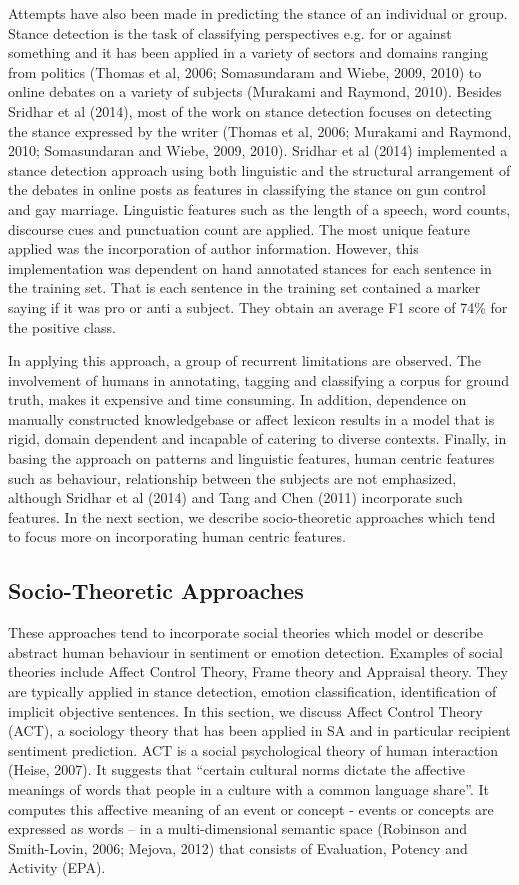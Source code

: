 Attempts have also been made in predicting the stance of an individual or group. Stance detection is the task of classifying perspectives e.g. for or against something and it has been applied in a variety of sectors and domains ranging from politics (Thomas et al, 2006; Somasundaram and Wiebe, 2009, 2010) to online debates on a variety of subjects (Murakami and Raymond, 2010). Besides Sridhar et al (2014), most of the work on stance detection focuses on detecting the stance expressed by the writer (Thomas et al, 2006; Murakami and Raymond, 2010; Somasundaran and Wiebe, 2009, 2010). Sridhar et al (2014) implemented a stance detection approach using both linguistic and the structural arrangement of the debates in online posts as features in classifying the stance on gun control and gay marriage. Linguistic features such as the length of a speech, word counts, discourse cues and punctuation count are applied. The most unique feature applied was the incorporation of author information. However, this implementation was dependent on hand annotated stances for each sentence in the training set. That is each sentence in the training set contained a marker saying if it was pro or anti a subject. They obtain an average F1 score of 74\% for the positive class. 


In applying this approach, a group of recurrent limitations are observed. The involvement of humans in annotating, tagging and classifying a corpus for ground truth, makes it expensive and time consuming. In addition, dependence on manually constructed knowledgebase or affect lexicon results in a model that is rigid, domain dependent and incapable of catering to diverse contexts. Finally, in basing the approach on patterns and linguistic features, human centric features such as behaviour, relationship between the subjects are not emphasized, although Sridhar et al (2014) and Tang and Chen (2011) incorporate such features. In the next section, we describe socio-theoretic approaches which tend to focus more on incorporating human centric features.


\subsection{Socio-Theoretic Approaches}
These approaches tend to incorporate social theories which model or describe abstract human behaviour in sentiment or emotion detection. Examples of social theories include Affect Control Theory, Frame theory and Appraisal theory.  They are typically applied in stance detection, emotion classification, identification of implicit objective sentences. 
In this section, we discuss Affect Control Theory (ACT), a sociology theory that has been applied in SA and in particular recipient sentiment prediction. 
ACT is a social psychological theory of human interaction (Heise, 2007). It suggests that ``certain cultural norms dictate the affective meanings of words that people in a culture with a common language share''. It computes this affective meaning of an event or concept - events or concepts are expressed as words -- in a multi-dimensional semantic space (Robinson and Smith-Lovin, 2006; Mejova, 2012) that consists of Evaluation, Potency and Activity (EPA). 


